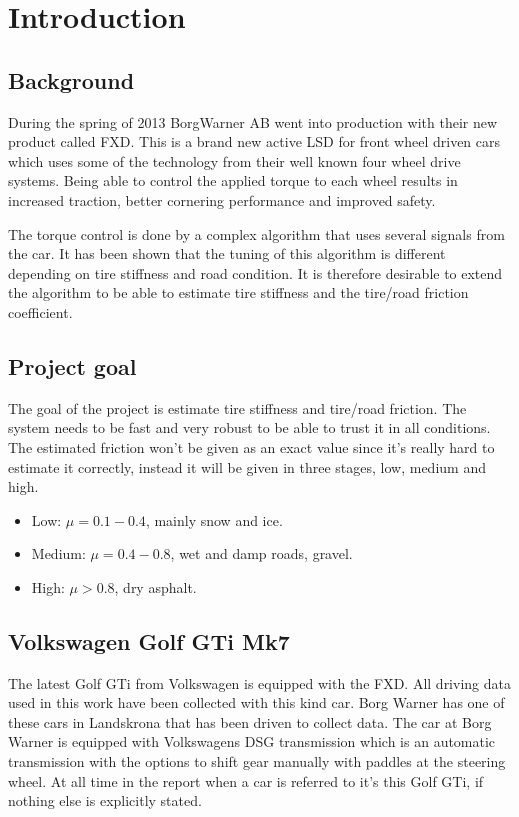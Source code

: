 \chapter{Introduction}

\section{Background}
During the spring of 2013 BorgWarner AB went into production with their new product called FXD. This is a brand new active LSD for front wheel driven cars which uses some of the technology from their well known four wheel drive systems. Being able to control the applied torque to each wheel results in increased traction, better cornering performance and improved safety.

The torque control is done by a complex algorithm that uses several signals from the car. It has been shown that the tuning of this algorithm is different depending on tire stiffness and road condition. It is therefore desirable to extend the algorithm to be able to estimate tire stiffness and the tire/road friction coefficient.


\section{Project goal}
The goal of the project is estimate tire stiffness and tire/road friction. The system needs to be fast and very robust to be able to trust it in all conditions. The estimated friction won't be given as an exact value since it's really hard to estimate it correctly, instead it will be given in three stages, low, medium and high.

\begin{itemize}
	\item Low: $ \mu = 0.1-0.4 $, mainly snow and ice.
	\item Medium: $ \mu = 0.4-0.8 $, wet and damp roads, gravel.
	\item High: $ \mu > 0.8 $, dry asphalt.
\end{itemize}

\section{Volkswagen Golf GTi Mk7}
The latest Golf GTi from Volkswagen is equipped with the FXD. All driving data used in this work have been collected with this kind car. Borg Warner has one of these cars in Landskrona that has been driven to collect data. The car at Borg Warner is equipped with Volkswagens DSG transmission which is an automatic transmission with the options to shift gear manually with paddles at the steering wheel. At all time in the report when a car is referred to it's this Golf GTi, if nothing else is explicitly stated.

